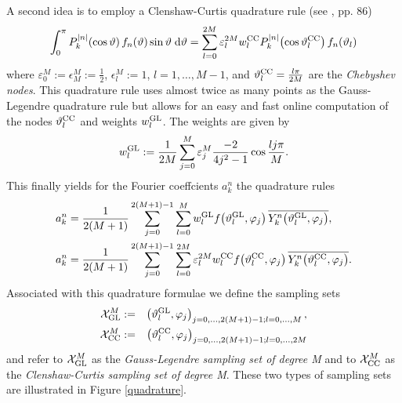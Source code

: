 A second idea is to employ a Clenshaw-Curtis quadrature rule (see \cite{dara}, pp. 86)
$$
  \int_{0}^{\pi} P_{k}^{\left\vert n\right\vert}{\hspace{-0.4ex}}\left(\cos \vartheta\right) f_{n}{\hspace{-0.4ex}}\left(\vartheta\right) \sin \vartheta \; \text{\rm{d}} \vartheta = \sum_{l=0}^{2M} \varepsilon_{l}^{2M} w_{l}^{\mbox{\scriptsize\rm{CC}}} P_{k}^{\left\vert n\right\vert}{\hspace{-0.4ex}}\left(\cos \vartheta_{l}^{\mbox{\scriptsize\rm{CC}}}\right) f_{n}{\hspace{-0.4ex}}\left(\vartheta_{l}\right)
$$
where $\varepsilon_{0}^{M} := \epsilon_{M}^M := \frac{1}{2}$, $\epsilon_{l}^M := 1$, $l=1,\dots,M-1$, and $\vartheta_{l}^{\mbox{\scriptsize\rm{CC}}} = \frac{l\pi}{2M}$ are the \emph{Chebyshev nodes}.
This quadrature rule uses almost twice as many points as the Gauss-Legendre quadrature rule but allows for an easy and fast online computation of the nodes $\vartheta_{l}^{\mbox{\scriptsize\rm{CC}}}$
and weights $w_{l}^{\mbox{\scriptsize\rm{GL}}}$. The weights are given by
$$ w_{l}^{\mbox{\scriptsize\rm{GL}}} := \frac{1}{2M} \sum_{j=0}^{M} \varepsilon_{j}^{M} \frac{-2}{4j^2-1} \cos\frac{lj\pi}{M}.$$
This finally yields for the Fourier coeffcients $a_{k}^n$ the quadrature rules 
\begin{equation}
  \label{NFSFT:iDSFT}
  \begin{split}
    a_{k}^n & = \frac{1}{2(M+1)} \sum_{j=0}^{2(M+1)-1} \sum_{l=0}^{M} w_{l}^{\mbox{\scriptsize\rm{GL}}} f{\hspace{-0.4ex}}\left(\vartheta_{l}^{\mbox{\scriptsize\rm{GL}}},\varphi_{j}\right) \overline{Y_{k}^n{\hspace{-0.4ex}}\left(\vartheta_{l}^{\mbox{\scriptsize\rm{GL}}},\varphi_{j}\right)},\\
    a_{k}^n & = \frac{1}{2(M+1)} \sum_{j=0}^{2(M+1)-1} \sum_{l=0}^{2M} \varepsilon_{l}^{2M} w_{l}^{\mbox{\scriptsize\rm{CC}}} f{\hspace{-0.4ex}}\left(\vartheta_{l}^{\mbox{\scriptsize\rm{CC}}},\varphi_{j}\right) 
  \overline{Y_{k}^n{\hspace{-0.4ex}}\left(\vartheta_{l}^{\mbox{\scriptsize\rm{CC}}},\varphi_{j}\right)}.
  \end{split}
\end{equation}
Associated with this quadrature formulae we define the sampling sets
\begin{eqnarray*}
  \mathcal{X}_{\mbox{\scriptsize\rm{GL}}}^M & := & \left(\vartheta_{l}^{\mbox{\scriptsize\rm{GL}}},\varphi_{j}\right)_{j=0,\dots,2(M+1)-1;l=0,\dots,M},\\
  \mathcal{X}_{\mbox{\scriptsize\rm{CC}}}^M & := & \left(\vartheta_{l}^{\mbox{\scriptsize\rm{CC}}},\varphi_{j}\right)_{j=0,\dots,2(M+1)-1;l=0,\dots,2M}
\end{eqnarray*}
and refer to $\mathcal{X}_{\mbox{\scriptsize\rm{GL}}}^M$ as the \emph{Gauss-Legendre sampling set of degree M} and to $\mathcal{X}_{\mbox{\scriptsize\rm{CC}}}^M$ as the 
\emph{Clenshaw-Curtis sampling set of degree M}. These two types of sampling sets are illustrated in Figure \ref{quadrature}.
